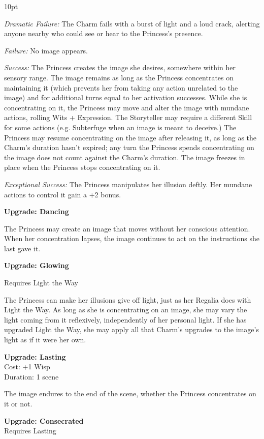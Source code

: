 \begin{myindentpar}{10pt}

\emph{Dramatic Failure:} The Charm fails with a burst of light and a loud crack, alerting
anyone nearby who could see or hear to the Princess's presence.

\emph{Failure:} No image appears.

\emph{Success:} The Princess creates the image she desires, somewhere within her sensory
range. The image remains as long as the Princess concentrates on maintaining it (which
prevents her from taking any action unrelated to the image) and for additional turns equal
to her activation successes. While she is concentrating on it, the Princess may move and alter the image with mundane actions, rolling Wits + Expression. The Storyteller may require
a different Skill for some actions (e.g. Subterfuge when an image is meant to deceive.) The
Princess may resume concentrating on the image after releasing it, as long as the Charm’s
duration hasn’t expired; any turn the Princess spends concentrating on the image does not
count against the Charm’s duration. The image freezes in place when the Princess stops
concentrating on it.

\emph{Exceptional Success:} The Princess manipulates her illusion deftly. Her mundane actions to control it gain a +2 bonus.

\textbf{Upgrade: Dancing}

The Princess may create an image that moves without her conscious attention. When
her concentration lapses, the image continues to act on the instructions she last gave it.

\textbf{Upgrade: Glowing}

Requires Light the Way

The Princess can make her illusions give off light, just as her Regalia does with Light
the Way. As long as she is concentrating on an image, she may vary the light coming from it
reflexively, independently of her personal light. If she has upgraded Light the Way, she may
apply all that Charm’s upgrades to the image’s light as if it were her own.

\textbf{Upgrade: Lasting}\\
Cost: +1 Wisp\\
Duration: 1 scene

The image endures to the end of the scene, whether the Princess concentrates on it or
not.

\textbf{Upgrade: Consecrated}\\
Requires Lasting


\end{myindentpar}
